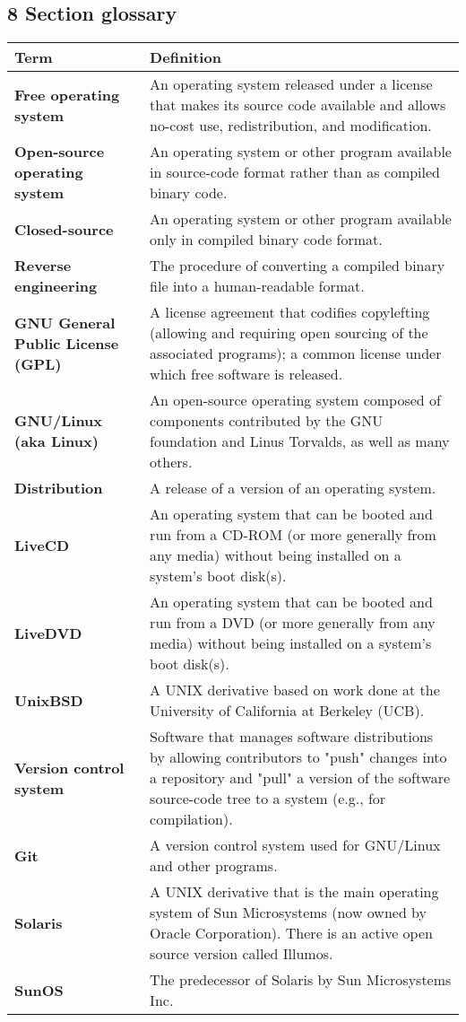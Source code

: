 \documentclass{article}
\begin{document}
\subsection*{8 Section glossary}
\centering
\begin{tabular}{>{\raggedright}p{} >{\raggedright\arraybackslash}p{}}
\toprule
\textbf{Term} & \textbf{Definition} \\
\midrule
\textbf{Free operating system} & An operating system released under a license that makes its source code available and allows no-cost use, redistribution, and modification. \\
\textbf{Open-source operating system} & An operating system or other program available in source-code format rather than as compiled binary code. \\
\textbf{Closed-source} & An operating system or other program available only in compiled binary code format. \\
\textbf{Reverse engineering} & The procedure of converting a compiled binary file into a human-readable format. \\
\textbf{GNU General Public License (GPL)} & A license agreement that codifies copylefting (allowing and requiring open sourcing of the associated programs); a common license under which free software is released. \\
\textbf{GNU/Linux (aka Linux)} & An open-source operating system composed of components contributed by the GNU foundation and Linus Torvalds, as well as many others. \\
\textbf{Distribution} & A release of a version of an operating system. \\
\textbf{LiveCD} & An operating system that can be booted and run from a CD-ROM (or more generally from any media) without being installed on a system's boot disk(s). \\
\textbf{LiveDVD} & An operating system that can be booted and run from a DVD (or more generally from any media) without being installed on a system's boot disk(s). \\
\textbf{UnixBSD} & A UNIX derivative based on work done at the University of California at Berkeley (UCB). \\
\textbf{Version control system} & Software that manages software distributions by allowing contributors to "push" changes into a repository and "pull" a version of the software source-code tree to a system (e.g., for compilation). \\
\textbf{Git} & A version control system used for GNU/Linux and other programs. \\
\textbf{Solaris} & A UNIX derivative that is the main operating system of Sun Microsystems (now owned by Oracle Corporation). There is an active open source version called Illumos. \\
\textbf{SunOS} & The predecessor of Solaris by Sun Microsystems Inc. \\
\bottomrule
\end{tabular}
\vspace{\baselineskip}
\end{document}
